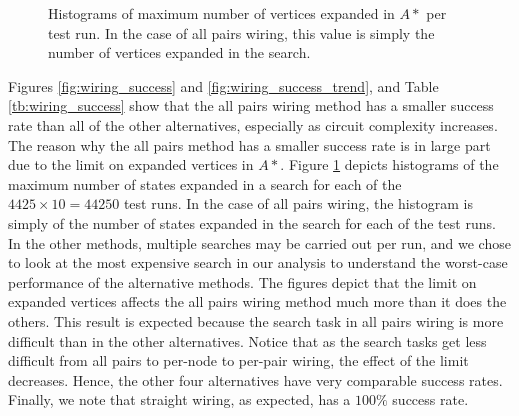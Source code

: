 \begin{figure}
\begin{center}
\caption[Expanded vertices histograms]{Histograms of maximum number of vertices
expanded in $A*$ per test run.
In the case of all pairs wiring, this value is simply the number of vertices
expanded in the search.}
\label{fig:max_expanded}
\end{center}
\end{figure}
Figures \ref{fig:wiring_success} and \ref{fig:wiring_success_trend}, and Table
\ref{tb:wiring_success} show that the all pairs wiring method has a smaller
success rate than all of
the other alternatives, especially as circuit complexity increases. The reason
why the all pairs method has a smaller success rate is in
large part due to the limit on expanded vertices in $A*$.
Figure \ref{fig:max_expanded} depicts histograms of the maximum number of
states expanded in a search for each of the $4425 \times 10 = 44250$ test runs.
In the case of all pairs wiring, the histogram is simply of the number of
states expanded in the search for each of the test runs. In the other methods,
multiple searches may be carried out per run, and we chose to look at the most
expensive search in our analysis to understand the worst-case performance of
the alternative methods. The figures depict that the limit on expanded
vertices affects
the all pairs wiring method much more than it does the others. This result is
expected because the search task in all pairs wiring is more difficult than in
the other alternatives. Notice that as the search tasks get less difficult from
all pairs to per-node to per-pair wiring, the effect of the limit
decreases. Hence, the other four alternatives have very comparable success rates.
Finally, we note that straight wiring, as expected, has a $100\%$ success rate.

